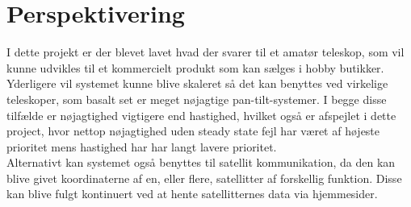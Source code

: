 \section{Perspektivering}

I dette projekt er der blevet lavet hvad der svarer til et amatør teleskop, som vil kunne udvikles til et kommercielt produkt som kan sælges i hobby butikker. Yderligere vil systemet kunne blive skaleret så det kan benyttes ved virkelige teleskoper, som basalt set er meget nøjagtige pan-tilt-systemer. I begge disse tilfælde er nøjagtighed vigtigere end hastighed, hvilket også er afspejlet i dette project, hvor nettop nøjagtighed uden steady state fejl har været af højeste prioritet mens hastighed har har langt lavere prioritet.
\\
Alternativt kan systemet også benyttes til satellit kommunikation, da den kan blive givet koordinaterne af en, eller flere, satellitter af forskellig funktion. Disse kan blive fulgt kontinuert ved at hente satellitternes data via hjemmesider.